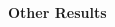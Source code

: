 \documentclass[portrait,a0b,final,a4resizeable]{include/a0poster}
\begin{document}
\begin{poster}
\begin{multicols}{2}
%
%
%

\end{multicols}


\vspace*{3cm}

\begin{center}
\begin{pcolumn}{1.03}

{}
{
  \begin{center}
    {\sffamily \VeryHuge \textbf{Other Results}}
  \end{center}
}
\end{pcolumn}
\end{center}




\begin{multicols}{2}




\end{multicols}
\end{poster}
\end{document}
